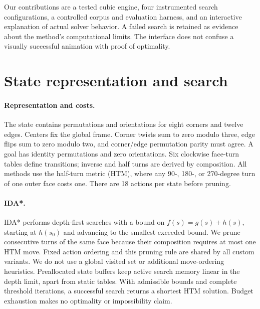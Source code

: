 \documentclass{article}
\begin{document}
Our contributions are a tested cubie engine, four instrumented search configurations, a controlled corpus and evaluation harness, and an interactive explanation of actual solver behavior. A failed search is retained as evidence about the method's computational limits. The interface does not confuse a visually successful animation with proof of optimality.

\section{State representation and search}
\paragraph{Representation and costs.}
The state contains permutations and orientations for eight corners and twelve edges. Centers fix the global frame. Corner twists sum to zero modulo three, edge flips sum to zero modulo two, and corner/edge permutation parity must agree. A goal has identity permutations and zero orientations. Six clockwise face-turn tables define transitions; inverse and half turns are derived by composition. All methods use the half-turn metric (HTM), where any 90-, 180-, or 270-degree turn of one outer face costs one. There are 18 actions per state before pruning.

\paragraph{IDA*.}
IDA* performs depth-first searches with a bound on $f(s)=g(s)+h(s)$, starting at $h(s_0)$ and advancing to the smallest exceeded bound. We prune consecutive turns of the same face because their composition requires at most one HTM move. Fixed action ordering and this pruning rule are shared by all custom variants. We do not use a global visited set or additional move-ordering heuristics. Preallocated state buffers keep active search memory linear in the depth limit, apart from static tables. With admissible bounds and complete threshold iterations, a successful search returns a shortest HTM solution. Budget exhaustion makes no optimality or impossibility claim.
\end{document}
